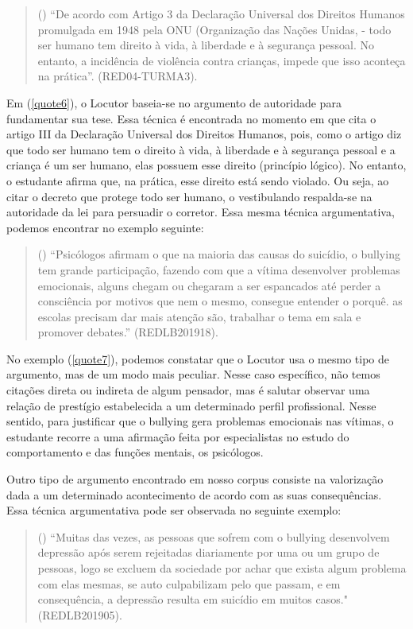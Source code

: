 \documentclass{textolivre}
\newcounter{quote}
\newenvironment{myquote}%
{%
\refstepcounter{quote}%
\begin{quote}(\thequote)%
}%
{\end{quote}}%
\begin{document}
\begin{myquote}\label{quote6}
“De acordo com Artigo 3 da Declaração Universal dos Direitos Humanos promulgada em 1948 pela ONU (Organização das Nações Unidas, - todo ser humano tem direito à vida, à liberdade e à segurança pessoal. No entanto, a incidência de violência contra crianças, impede que isso aconteça na prática”. (RED04-TURMA3).
\end{myquote}

Em (\ref{quote6}), o Locutor baseia-se no argumento de autoridade para fundamentar sua tese. Essa técnica é encontrada no momento em que cita o artigo III da Declaração Universal dos Direitos Humanos, pois, como o artigo diz que todo ser humano tem o direito à vida, à liberdade e à segurança pessoal e a criança é um ser humano, elas possuem esse direito (princípio lógico). No entanto, o estudante afirma que, na prática, esse direito está sendo violado. Ou seja, ao citar o decreto que protege todo ser humano, o vestibulando respalda-se na autoridade da lei para persuadir o corretor. Essa mesma técnica argumentativa, podemos encontrar no exemplo seguinte:

\begin{myquote}\label{quote7}
“Psicólogos afirmam o que na maioria das causas do suicídio, o bullying tem grande participação, fazendo com que a vítima desenvolver problemas emocionais, alguns chegam ou chegaram a ser espancados até perder a consciência por motivos que nem o mesmo, consegue entender o porquê. as escolas precisam dar mais atenção são, trabalhar o tema em sala e promover debates.” (REDLB201918).
\end{myquote}

No exemplo (\ref{quote7}), podemos constatar que o Locutor usa o mesmo tipo de argumento, mas de um modo mais peculiar. Nesse caso específico, não temos citações direta ou indireta de algum pensador, mas é salutar observar uma relação de prestígio estabelecida a um determinado perfil profissional. Nesse sentido, para justificar que o bullying gera problemas emocionais nas vítimas, o estudante recorre a uma afirmação feita por especialistas no estudo do comportamento e das funções mentais, os psicólogos.

Outro tipo de argumento encontrado em nosso corpus consiste na valorização dada a um determinado acontecimento de acordo com as suas consequências. Essa técnica argumentativa pode ser observada no seguinte exemplo:

\begin{myquote}\label{quote8}
“Muitas das vezes, as pessoas que sofrem com o bullying desenvolvem depressão após serem rejeitadas diariamente por uma ou um grupo de pessoas, logo se excluem da sociedade por achar que exista algum problema com elas mesmas, se auto culpabilizam pelo que passam, e em consequência, a depressão resulta em suicídio em muitos casos." (REDLB201905).
\end{myquote}
\end{document}
